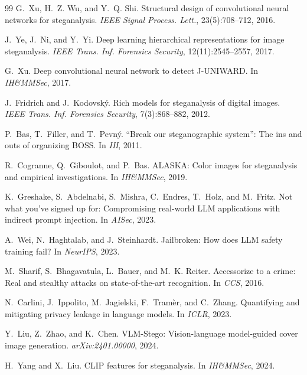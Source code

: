 \documentclass[10pt,a4paper]{article}
\begin{document}
\begin{thebibliography}{99}
G.~Xu, H.~Z. Wu, and Y.~Q. Shi.
\newblock Structural design of convolutional neural networks for
steganalysis.
\newblock \emph{IEEE Signal Process. Lett.}, 23(5):708--712, 2016.

J.~Ye, J.~Ni, and Y.~Yi.
\newblock Deep learning hierarchical representations for image
steganalysis.
\newblock \emph{IEEE Trans. Inf. Forensics Security}, 12(11):2545--2557,
2017.

G.~Xu.
\newblock Deep convolutional neural network to detect J-UNIWARD.
\newblock In \emph{IH\&MMSec}, 2017.

J.~Fridrich and J.~Kodovsk\'{y}.
\newblock Rich models for steganalysis of digital images.
\newblock \emph{IEEE Trans. Inf. Forensics Security}, 7(3):868--882,
2012.

P.~Bas, T.~Filler, and T.~Pevn\'{y}.
\newblock ``Break our steganographic system'': The ins and outs of
organizing BOSS.
\newblock In \emph{IH}, 2011.

R.~Cogranne, Q.~Giboulot, and P.~Bas.
\newblock ALASKA: Color images for steganalysis and empirical
investigations.
\newblock In \emph{IH\&MMSec}, 2019.

K.~Greshake, S.~Abdelnabi, S.~Mishra, C.~Endres, T.~Holz, and M.~Fritz.
\newblock Not what you've signed up for: Compromising real-world LLM
applications with indirect prompt injection.
\newblock In \emph{AISec}, 2023.

A.~Wei, N.~Haghtalab, and J.~Steinhardt.
\newblock Jailbroken: How does LLM safety training fail?
\newblock In \emph{NeurIPS}, 2023.

M.~Sharif, S.~Bhagavatula, L.~Bauer, and M.~K. Reiter.
\newblock Accessorize to a crime: Real and stealthy attacks on
state-of-the-art recognition.
\newblock In \emph{CCS}, 2016.

N.~Carlini, J.~Ippolito, M.~Jagielski, F.~Tramèr, and C.~Zhang.
\newblock Quantifying and mitigating privacy leakage in
language models.
\newblock In \emph{ICLR}, 2023.

Y.~Liu, Z.~Zhao, and K.~Chen.
\newblock VLM-Stego: Vision-language model-guided cover image
generation.
\newblock \emph{arXiv:2401.00000}, 2024.

H.~Yang and X.~Liu.
\newblock CLIP features for steganalysis.
\newblock In \emph{IH\&MMSec}, 2024.


\end{thebibliography}
\end{document}
